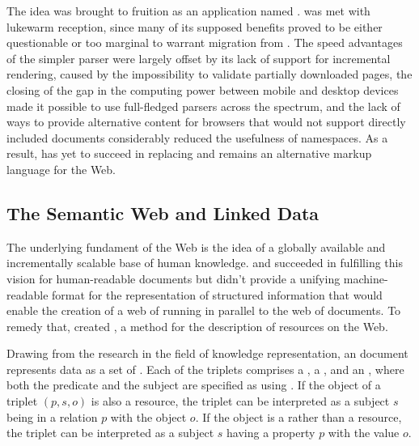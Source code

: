 \documentclass[a5paper,10pt]{book}
\begin{document}
The idea was brought to fruition as an  application named
.  was met with lukewarm reception, since many of
its supposed benefits proved to be either questionable or too marginal to
warrant migration from . The speed advantages of the simpler
parser were largely offset by its lack of support for incremental rendering,
caused by the impossibility to validate partially downloaded pages, the closing
of the gap in the computing power between mobile and desktop devices made it
possible to use full-fledged  parsers across the spectrum, and the
lack of ways to provide alternative content for browsers that would not support
directly included  documents considerably reduced the usefulness
of  namespaces. As a result,  has yet to succeed in
replacing  and remains an alternative markup language for the Web.


\subsection{The Semantic Web and Linked Data}
The underlying fundament of the Web is the idea of a globally available and
incrementally scalable base of human knowledge.  and
 succeeded in fulfilling this vision for human-readable documents
but didn't provide a unifying machine-readable format for the representation of
structured information that would enable the creation of a web of 
running in parallel to the web of documents. To remedy that, 
created , a method for the description of resources on the Web.

Drawing from the research in the field of knowledge representation, an
 document represents data as a set of %
. Each of the triplets comprises a
, a %
, and an ,
where both the predicate and the subject are specified as 
 using . If the object of a triplet
$(p,s,o)$ is also a resource, the triplet can be interpreted as a subject $s$
being in a relation $p$ with the object $o$. If the object is a   rather than a resource, the triplet can be
interpreted as a subject $s$ having a property $p$ with the value $o$.
\end{document}
